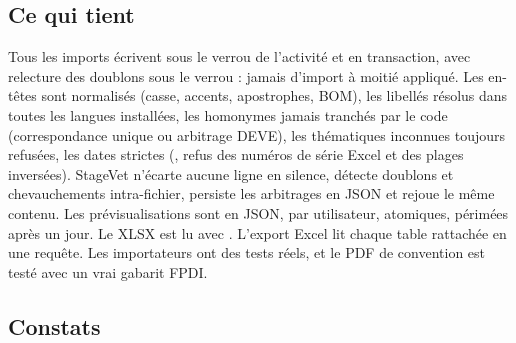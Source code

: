 \documentclass[11pt,a4paper]{article}
\begin{document}
\subsection{Ce qui tient}

Tous les imports écrivent sous le verrou de l'activité et en transaction, avec relecture des
doublons sous le verrou : jamais d'import à moitié appliqué. Les en-têtes sont normalisés
(casse, accents, apostrophes, BOM), les libellés résolus dans toutes les langues installées, les
homonymes jamais tranchés par le code (correspondance unique ou arbitrage DEVE), les thématiques
inconnues toujours refusées, les dates strictes (, refus des numéros de série
Excel et des plages inversées). StageVet n'écarte aucune ligne en silence, détecte doublons et
chevauchements intra-fichier, persiste les arbitrages en JSON et rejoue le même contenu. Les
prévisualisations sont en JSON, par utilisateur, atomiques, périmées après un jour. Le XLSX est
lu avec . L'export Excel lit chaque table rattachée en une requête. Les
importateurs ont des tests réels, et le PDF de convention est testé avec un vrai gabarit FPDI.

\subsection{Constats}
\end{document}
